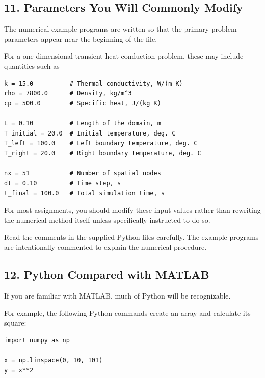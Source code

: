 \documentclass[11pt]{article}
\begin{document}
\subsection*{11. Parameters You Will Commonly Modify}

The numerical example programs are written so that the primary problem
parameters appear near the beginning of the file.

For a one-dimensional transient heat-conduction problem, these may
include quantities such as

\begin{lstlisting}[style=python]
k = 15.0          # Thermal conductivity, W/(m K)
rho = 7800.0      # Density, kg/m^3
cp = 500.0        # Specific heat, J/(kg K)

L = 0.10          # Length of the domain, m
T_initial = 20.0  # Initial temperature, deg. C
T_left = 100.0    # Left boundary temperature, deg. C
T_right = 20.0    # Right boundary temperature, deg. C

nx = 51           # Number of spatial nodes
dt = 0.10         # Time step, s
t_final = 100.0   # Total simulation time, s
\end{lstlisting}

For most assignments, you should modify these input values rather than
rewriting the numerical method itself unless specifically instructed to
do so.

Read the comments in the supplied Python files carefully. The example
programs are intentionally commented to explain the numerical procedure.

\subsection*{12. Python Compared with MATLAB}

If you are familiar with MATLAB, much of Python will be recognizable.

For example, the following Python commands create an array and calculate
its square:

\begin{lstlisting}[style=python]
import numpy as np

x = np.linspace(0, 10, 101)
y = x**2
\end{lstlisting}
\end{document}
